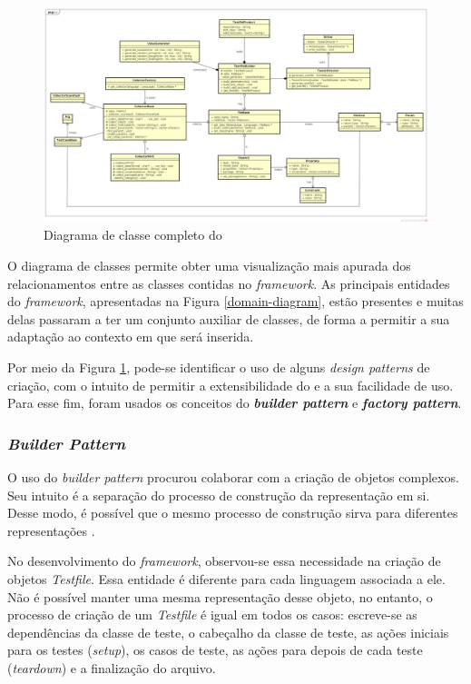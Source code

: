 \begin{landscape}
\begin{figure}[h]
  \centering
    \includegraphics[width=1.5\textwidth]{figuras/class-diagram.png}
    \caption{Diagrama de classe completo do \scarefault}
    \label{class-diagram}
\end{figure}
\FloatBarrier
\end{landscape}

O diagrama de classes permite obter uma visualização mais apurada dos
relacionamentos entre as classes contidas no \textit{framework}. As principais
entidades do \textit{framework}, apresentadas na Figura \ref{domain-diagram},
estão presentes e muitas delas passaram a ter um conjunto auxiliar de classes,
de forma a permitir a sua adaptação ao contexto em que será inserida.

Por meio da Figura \ref{class-diagram}, pode-se identificar o uso de alguns
\textit{design patterns} de criação, com o intuito de permitir a
extensibilidade do \framework e a sua facilidade de uso. Para esse fim,
foram usados os conceitos do \textbf{\textit{builder pattern}} e
\textbf{\textit{factory pattern}}.

\subsubsection{\textit{Builder Pattern}}
O uso do \textit{builder pattern} procurou colaborar com a criação de objetos complexos. Seu intuito é a separação do processo
de construção da representação em si. Desse modo, é possível que o
mesmo processo de construção sirva para diferentes representações
\cite{gammaEtAl1994}.

No desenvolvimento do \textit{framework}, observou-se essa necessidade na
criação de objetos \textit{Testfile}. Essa entidade é diferente para
cada linguagem associada a ele. Não é possível manter uma mesma
representação desse objeto, no entanto, o processo de criação de um
\textit{Testfile} é igual em todos os casos: escreve-se as
dependências da classe de teste, o cabeçalho da classe de teste,
as ações iniciais para os testes (\textit{setup}),
os casos de teste, as ações para depois de cada teste
(\textit{teardown}) e a finalização do arquivo.

